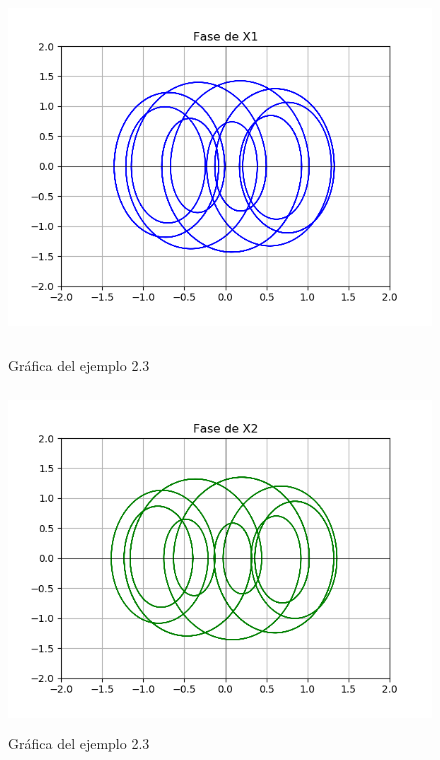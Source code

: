 \begin{figure}[h!]
	\begin{center}
        \includegraphics[height=9cm]{Ejem2_3-GrafA}
        \caption{Gráfica del ejemplo 2.3}
        \label{Ejem2.3-GrafA}

    	\includegraphics[height=9cm]{Ejem2_3-GrafB}
        \caption{Gráfica del ejemplo 2.3}
    \end{center}
\end{figure}

